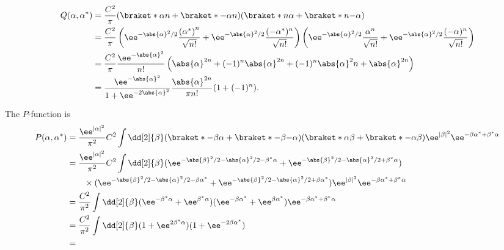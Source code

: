 
\[
        \begin{aligned}
            Q(\alpha, \alpha^*) &= \frac{C^2}{\pi} (\braket*{\alpha}{n} + \braket*{-\alpha}{n}) (\braket*{n}{\alpha} + \braket*{n}{-\alpha}) \\
            &= \frac{C^2}{\pi}  \left(  \ee^{-\abs{\alpha}^2/2} \frac{{(\alpha^*)}^n}{\sqrt{n!}} + \ee^{-\abs{\alpha}^2/2} \frac{(-\alpha^*)^n}{\sqrt{n!}} \right) \left(  \ee^{-\abs{\alpha}^2/2} \frac{{\alpha}^n}{\sqrt{n!}} + \ee^{-\abs{\alpha}^2/2} \frac{(-\alpha)^n}{\sqrt{n!}} \right) \\
            &= \frac{C^2}{\pi} \frac{\ee^{-\abs{\alpha}^2}}{n!} \left( \abs{\alpha}^{2n} + (-1)^n \abs{\alpha}^{2n} + (-1)^n \abs{\alpha}^2n + \abs{\alpha}^{2n} \right) \\
            &= \frac{\ee^{-\abs{\alpha}^2}}{1 + \ee^{- 2 \abs{\alpha}^2}} \frac{\abs{\alpha}^{2n}}{\pi n!} (1 + (-1)^n).
        \end{aligned}
    \]

    The $P$-function is 
    \[
        \begin{aligned}
            P(\alpha, \alpha^*) &= \frac{\ee^{\left| \alpha \right|^{2}}}{\pi^{2}} C^2 \int \dd[2]{\beta} (\braket*{-\beta}{\alpha} + \braket*{-\beta}{- \alpha}) (\braket*{\alpha}{\beta} + \braket*{-\alpha}{\beta}) \ee^{|\beta|^{2}} \ee^{-\beta \alpha^{*}+\beta^{*} \alpha} \\
            &= \frac{\ee^{\left| \alpha \right|^{2}}}{\pi^{2}} C^2 \int \dd[2]{\beta} (\ee^{- \abs{\beta}^2 / 2 - \abs{\alpha}^2 / 2 -\beta^* \alpha} + \ee^{- \abs{\beta}^2 / 2 - \abs{\alpha}^2 / 2 + \beta^* \alpha}) \\
            &\quad \quad \times (\ee^{- \abs{\beta}^2 / 2 - \abs{\alpha}^2 / 2 -\beta \alpha^*} + \ee^{- \abs{\beta}^2 / 2 - \abs{\alpha}^2 / 2 + \beta \alpha^*}) \ee^{|\beta|^{2}} \ee^{-\beta \alpha^{*}+\beta^{*} \alpha}  \\
            &= \frac{C^2}{\pi^2} \int \dd[2]{\beta} (\ee^{-\beta^* \alpha} + \ee^{\beta^* \alpha}) (\ee^{- \beta \alpha^*} + \ee^{\beta \alpha^*}) \ee^{-\beta \alpha^* + \beta^* \alpha} \\
            &= \frac{C^2}{\pi^2} \int \dd[2]{\beta} (1 + \ee^{2 \beta^* \alpha}) (1 + \ee^{-2 \beta \alpha^*}) \\
            &= 
        \end{aligned}
    \]